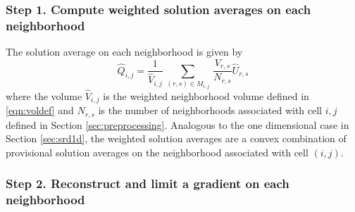 \subsubsection*{Step 1. Compute weighted solution averages on each neighborhood}   

The solution average on each neighborhood is given by
\begin{equation}
\label{tiledef}
\widehat{Q}_{i,j} =  \frac{1}{{\widehat V}_{i,j}} \, \sum_{(r,s) \in M_{i,j}} \,  
\frac{V_{r,s}}{N_{r,s}}  \widehat{U}_{r,s}
\end{equation}
where the volume ${\widehat V}_{i,j}$ is the weighted neighborhood volume defined in \eqref{eqn:voldef}
and $N_{r,s}$ is the number of neighborhoods  associated with cell $i,j$ defined in 
Section \ref{sec:preprocessing}.  
Analogous to the one dimensional case in Section \ref{sec:srd1d}, the weighted solution 
averages are a convex combination of provisional solution averages on the
neighborhood associated with cell $(i,j)$.  

\subsubsection*{Step 2. Reconstruct and limit a gradient on each neighborhood}

